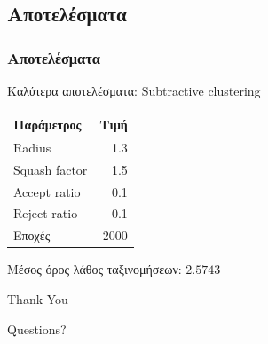 \documentclass[xetex,serif,mathserif,14pt]{beamer}
\begin{document}
\subsection{Αποτελέσματα}
\begin{frame}
\frametitle{Αποτελέσματα}
Καλύτερα αποτελέσματα: Subtractive clustering

\begin{table}
    \centering
    \begin{small}
        \begin{tabular}{@{}lr@{}}
            \toprule
            Παράμετρος    & \multicolumn{1}{l}{Τιμή} \\ \midrule
            Radius        & 1.3                      \\
            Squash factor & 1.5                      \\
            Accept ratio  & 0.1                      \\
            Reject ratio  & 0.1                      \\
            Εποχές        & 2000                     \\ \bottomrule
        \end{tabular}
    \end{small}
\end{table}

Μέσος όρος λάθος ταξινομήσεων: $2.5743$
\end{frame}



\begin{frame}

\Huge{\centerline{Thank You}}
\Large{\centerline{Questions?}}
\end{frame}
\end{document}
